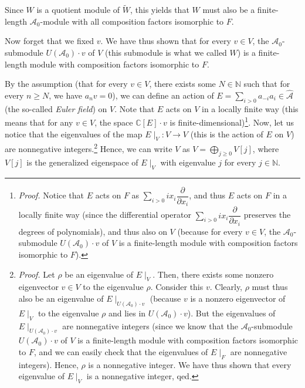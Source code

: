 \documentclass[etingof-lie.tex]{subfiles}
\begin{document}
Since $W$ is a quotient module of $\widetilde{W}$, this yields that $W$ must
also be a finite-length $\mathcal{A}_{0}$-module with all composition factors
isomorphic to $F$.

Now forget that we fixed $v$. We have thus shown that for every $v\in V$, the
$\mathcal{A}_{0}$-submodule $U\left(  \mathcal{A}_{0}\right)  \cdot v$ of $V$
(this submodule is what we called $W$) is a finite-length module with
composition factors isomorphic to $F$.

By the assumption (that for every $v\in V$, there exists some $N\in\mathbb{N}$
such that for every $n\geq N$, we have $a_{n}v=0$), we can define an action of
$E=\sum\limits_{i>0}a_{-i}a_{i}\in\widehat{\mathcal{A}}$ (the so-called
\textit{Euler field}) on $V$. Note that $E$ acts on $V$ in a locally finite
way (this means that for any $v\in V$, the space $\mathbb{C}\left[  E\right]
\cdot v$ is finite-dimensional)\footnote{\textit{Proof.} Notice that $E$ acts
on $F$ as $\sum\limits_{i>0}ix_{i}\dfrac{\partial}{\partial x_{i}}$, and thus
$E$ acts on $F$ in a locally finite way (since the differential operator
$\sum\limits_{i>0}ix_{i}\dfrac{\partial}{\partial x_{i}}$ preserves the
degrees of polynomials), and thus also on $V$ (because for every $v\in V$, the
$\mathcal{A}_{0}$-submodule $U\left(  \mathcal{A}_{0}\right)  \cdot v$ of $V$
is a finite-length module with composition factors isomorphic to $F$).}. Now,
let us notice that the eigenvalues of the map $E\mid_{V}:V\rightarrow V$ (this
is the action of $E$ on $V$) are nonnegative
integers.\footnote{\textit{Proof.} Let $\rho$ be an eigenvalue of $E\mid_{V}$.
Then, there exists some nonzero eigenvector $v\in V$ to the eigenvalue $\rho$.
Consider this $v$. Clearly, $\rho$ must thus also be an eigenvalue of
$E\mid_{U\left(  \mathcal{A}_{0}\right)  \cdot v}$ (because $v$ is a nonzero
eigenvector of $E\mid_{V}$ to the eigenvalue $\rho$ and lies in $U\left(
\mathcal{A}_{0}\right)  \cdot v$). But the eigenvalues of $E\mid_{U\left(
\mathcal{A}_{0}\right)  \cdot v}$ are nonnegative integers (since we know that
the $\mathcal{A}_{0}$-submodule $U\left(  \mathcal{A}_{0}\right)  \cdot v$ of
$V$ is a finite-length module with composition factors isomorphic to $F$, and
we can easily check that the eigenvalues of $E\mid_{F}$ are nonnegative
integers). Hence, $\rho$ is a nonnegative integer. We have thus shown that
every eigenvalue of $E\mid_{V}$ is a nonnegative integer, qed.} Hence, we can
write $V$ as $V=\bigoplus\limits_{j\geq0}V\left[  j\right]  $, where $V\left[
j\right]  $ is the generalized eigenspace of $E\mid_{V}$ with eigenvalue $j$
for every $j\in\mathbb{N}$.
\end{document}
